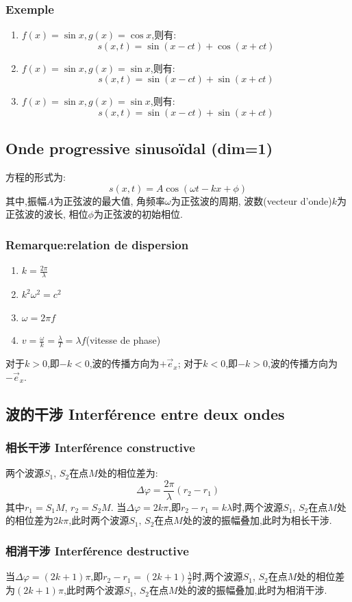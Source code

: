\documentclass[12pt, a4paper, oneside]{ctexbook}
\newcommand{\e }{\vec{e}}%
\begin{document}
\subsubsection{Exemple}
\begin{enumerate}
  \item $f(x)=\sin x,g(x)=\cos x$,则有:
  $$
    s(x,t)=\sin(x-ct)+\cos(x+ct)
  $$
  \item $f(x)=\sin x,g(x)=\sin x$,则有:
  $$
    s(x,t)=\sin(x-ct)+\sin(x+ct)
  $$
  \item $f(x)=\sin x,g(x)=\sin x$,则有:
  $$
    s(x,t)=\sin(x-ct)+\sin(x+ct)
  $$
\end{enumerate}
\subsection{Onde progressive sinusoïdal (dim=1) }
方程的形式为:
$$
s(x,t)=A\cos(\omega t-kx+\phi)
$$
其中,振幅$A$为正弦波的最大值,
角频率$\omega$为正弦波的周期,
波数(vecteur d'onde)$k$为正弦波的波长,
相位$\phi$为正弦波的初始相位.
\subsubsection{Remarque:relation de dispersion}
\begin{enumerate}
  \item $k=\frac{2\pi}{\lambda}$
  \item $k^2\omega^2=c^2$
  \item $\omega=2\pi f$
  \item $v=\frac{\omega}{k}=\frac{\lambda}{T}=\lambda f$(vitesse de phase)
\end{enumerate}
对于$k>0$,即$-k<0$,波的传播方向为$+\e_x$;
对于$k<0$,即$-k>0$,波的传播方向为$-\e_x$.
\subsection{波的干涉 Interférence entre deux ondes}
\subsubsection{相长干涉 Interférence constructive}
两个波源$S_1,\,S_2$在点$M$处的相位差为:
$$
\Delta \varphi=\frac{2\pi}{\lambda}(r_2-r_1)
$$
其中$r_1=S_1M$, $r_2=S_2M$.
当$\Delta \varphi=2k\pi$,即$r_2-r_1=k\lambda$时,两个波源$S_1,\,S_2$在点$M$处的相位差为$2k\pi$,此时两个波源$S_1,\,S_2$在点$M$处的波的振幅叠加,此时为相长干涉.
\subsubsection{相消干涉 Interférence destructive}
当$\Delta \varphi=(2k+1)\pi$,即$r_2-r_1=(2k+1)\frac{\lambda}{2}$时,两个波源$S_1,\,S_2$在点$M$处的相位差为$(2k+1)\pi$,此时两个波源$S_1,\,S_2$在点$M$处的波的振幅叠加,此时为相消干涉.
\end{document}
